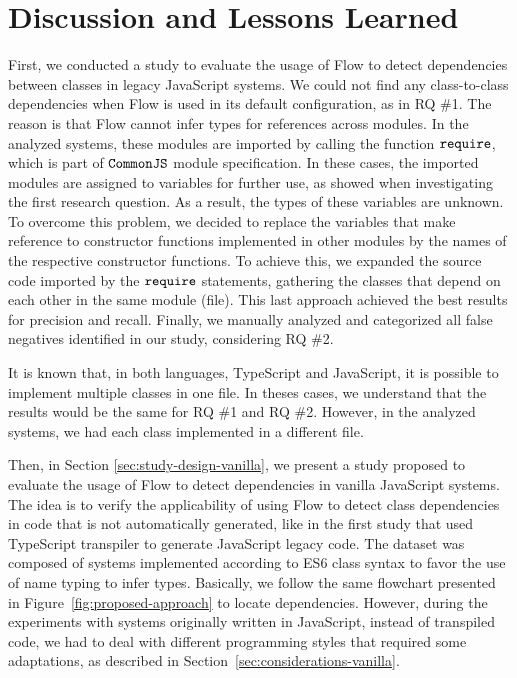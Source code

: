 \documentclass[review]{elsarticle}
\newcommand{\mcode}[1]{$\tt #1$}
\begin{document}



\section {Discussion and Lessons Learned}
\label{sec:discussion}

First, we conducted a study to evaluate the usage of Flow to detect dependencies between classes in legacy JavaScript systems. We could not find any class-to-class dependencies when Flow is used in its default configuration, as in RQ \#1. The reason is that Flow cannot infer types for references across modules. In the analyzed systems, these modules are imported by calling the function \mcode{require}, which is part of \mcode{CommonJS} module specification. In these cases, the imported modules are assigned to variables for further use, as showed when investigating the first research question. As a result, the types of these variables are unknown. To overcome this problem, we decided to replace the variables that make reference to constructor functions implemented in other modules by the names of the respective constructor functions. To achieve this, we expanded the source code imported by the \mcode{require} statements, gathering the classes that depend on each other in the same module (file). This last approach achieved the best results for precision and recall. Finally, we manually analyzed and categorized all false negatives identified in our study, considering RQ \#2. 

It is known that, in both languages, TypeScript and JavaScript, it is possible to implement multiple classes in one file. In theses cases, we understand that the results would be the same for RQ \#1 and RQ \#2. However, in the analyzed systems, we had each class implemented in a different file.

Then, in Section \ref{sec:study-design-vanilla}, we present a study proposed to evaluate the usage of Flow to detect dependencies in vanilla JavaScript systems. The idea is to verify the applicability of using Flow to detect class dependencies in code that is not automatically generated, like in the first study that used TypeScript transpiler to generate JavaScript legacy code. The dataset was composed of systems implemented according to ES6 class syntax to favor the use of name typing to infer types. Basically, we follow the same flowchart presented in Figure~\ref{fig:proposed-approach} to locate dependencies. However, during the experiments with systems originally written in JavaScript, instead of transpiled code, we had to deal with different programming styles that required some adaptations, as described in Section~\ref{sec:considerations-vanilla}. 
\end{document}
